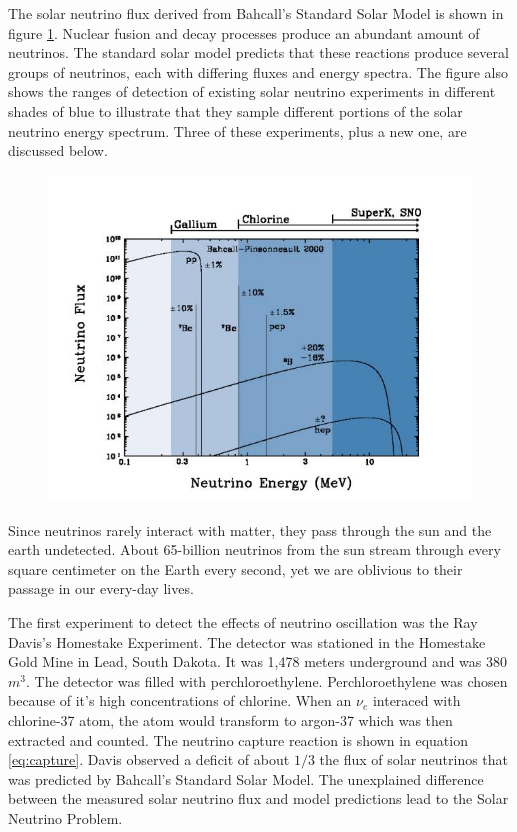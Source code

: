 The solar neutrino flux derived from Bahcall's Standard Solar Model is shown in figure \ref{fig:solarmodel}. Nuclear fusion and decay processes produce an abundant amount of neutrinos. The standard solar model predicts that these reactions produce several groups of neutrinos, each with differing fluxes and energy spectra. The figure also shows the ranges of detection of existing solar neutrino experiments in different shades of blue to illustrate that they sample different portions of the solar neutrino energy spectrum. Three of these experiments, plus a new one, are discussed below.

\begin{figure}[htp]
\centering
\includegraphics[scale=.55]{figs/solarmodel.jpg}
\label{fig:solarmodel}
\end{figure}

Since neutrinos rarely interact with matter, they pass through the sun and the earth undetected. About 65-billion neutrinos from the sun stream through every square centimeter on the Earth every second, yet we are oblivious to their passage in our every-day lives. \cite{bnl}

The first experiment to detect the effects of neutrino oscillation was the Ray Davis's Homestake Experiment. The detector was stationed in the Homestake Gold Mine in Lead, South Dakota. It was 1,478 meters underground and was 380 $m^{3}$. The detector was filled with perchloroethylene. Perchloroethylene was chosen because of it's high concentrations of chlorine. When an $\nu_{e}$ interaced with chlorine-37 atom, the atom would transform to argon-37 which was then extracted and counted. The neutrino capture reaction is shown in equation \ref{eq:capture}. Davis observed a deficit of about $1/3$ the flux of solar neutrinos that was predicted by Bahcall's Standard Solar Model. The unexplained difference between the measured solar neutrino flux and model predictions lead to the Solar Neutrino Problem.\cite{fnal}

